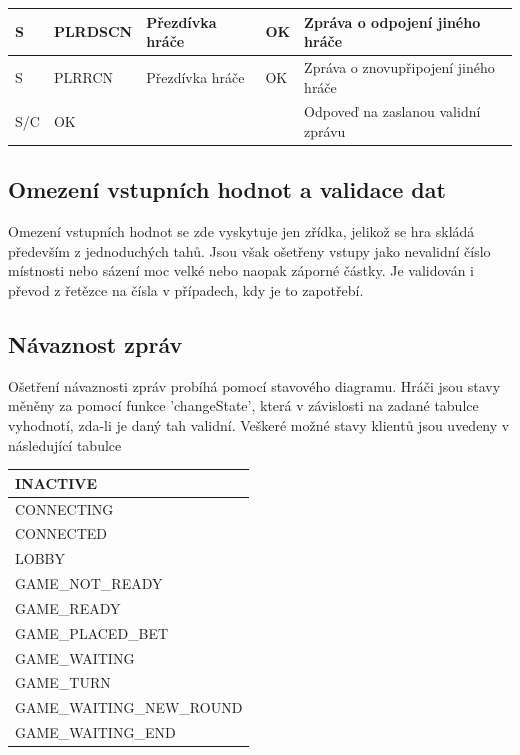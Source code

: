\documentclass[12pt]{article}
\begin{document}
\begin{table}[]
\begin{tabular}{|l|l|l|p{5.5cm}|p{3cm}|}
S          & PLRDSCN         & Přezdívka hráče & OK                                                                & Zpráva o odpojení jiného hráče                      \\ \hline
S          & PLRRCN          & Přezdívka hráče & OK                                                                & Zpráva o znovupřipojení jiného hráče                \\ \hline
S/C        & OK              &                 &                                                                   & Odpoveď na zaslanou validní zprávu                  \\ \hline
\end{tabular}
\end{table}

\newpage
\subsection{Omezení vstupních hodnot a validace dat}
Omezení vstupních hodnot se zde vyskytuje jen zřídka, jelikož se hra skládá především z jednoduchých tahů. Jsou však ošetřeny vstupy jako nevalidní číslo místnosti nebo sázení moc velké nebo naopak záporné částky. Je validován i převod z řetězce na čísla v případech, kdy je to zapotřebí. 

\subsection{Návaznost zpráv}
Ošetření návaznosti zpráv probíhá pomocí stavového diagramu. Hráči jsou stavy měněny za pomocí funkce 'changeState', která v závislosti na zadané tabulce vyhodnotí, zda-li je daný tah validní. Veškeré možné stavy klientů jsou uvedeny v následující tabulce

\begin{table}[htb]
\begin{tabular}{|l|}
\hline
INACTIVE                  \\ \hline
CONNECTING                \\ \hline
CONNECTED                 \\ \hline
LOBBY                     \\ \hline
GAME\_NOT\_READY          \\ \hline
GAME\_READY               \\ \hline
GAME\_PLACED\_BET         \\ \hline
GAME\_WAITING             \\ \hline
GAME\_TURN                \\ \hline
GAME\_WAITING\_NEW\_ROUND \\ \hline
GAME\_WAITING\_END        \\ \hline
\end{tabular}
\end{table}
\end{document}

